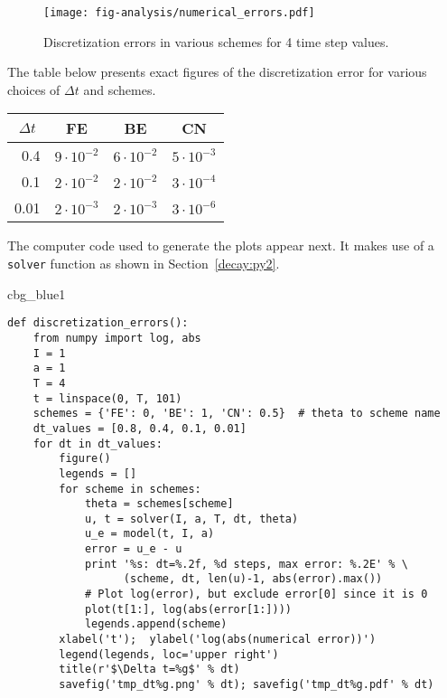 \documentclass[graybox,sectrefs,envcountresetchap,open=right,final]{svmonodo}
\newenvironment{_cod_tight}[1]{
   \def\FrameCommand{\colorbox{#1}}
   \FrameRule0.6pt\MakeFramed {\FrameRestore}\vskip3mm}
   {\vskip0mm\endMakeFramed}
\newenvironment{cod}[1]{
\bgroup\rmfamily
\fboxsep=0mm\relax
\begin{_cod_tight}{#1}
\list{}{\parsep=-2mm\parskip=0mm\topsep=0pt\leftmargin=2mm
\rightmargin=2\leftmargin\leftmargin=4pt\relax}
\item\relax}
{\endlist\end{_cod_tight}\egroup}
\begin{document}
\begin{figure}[!ht]  %
  \centerline{\texttt{[image: fig-analysis/numerical\_errors.pdf]}}
  \caption{
  Discretization errors in various schemes for 4 time step values. \label{decay:analysis:numerical_errors:fig}
  }
\end{figure}


The table below presents exact figures of the discretization error
for various choices of $\Delta t$ and schemes.



{\small   %

\vspace{4mm}

\begin{tabular}{rrrr}
\hline
\multicolumn{1}{c}{ $\Delta t$ } & \multicolumn{1}{c}{ FE } & \multicolumn{1}{c}{ BE } & \multicolumn{1}{c}{ CN } \\
\hline
0.4        & $9\cdot 10^{-2}$ & $6\cdot 10^{-2}$ & $ 5\cdot 10^{-3}$ \\
0.1        & $2\cdot 10^{-2}$ & $2\cdot 10^{-2}$ & $ 3\cdot 10^{-4}$ \\
0.01       & $2\cdot 10^{-3}$ & $2\cdot 10^{-3}$ & $ 3\cdot 10^{-6}$ \\
\hline
\end{tabular}

\vspace{4mm}

}


\noindent
The computer code used to generate the plots appear next. It makes use
of a \texttt{solver} function
as shown in Section~\ref{decay:py2}.

\begin{cod}{cbg_blue1}\begin{Verbatim}[numbers=none,fontsize=\fontsize{9pt}{9pt},baselinestretch=0.95,xleftmargin=2mm]
def discretization_errors():
    from numpy import log, abs
    I = 1
    a = 1
    T = 4
    t = linspace(0, T, 101)
    schemes = {'FE': 0, 'BE': 1, 'CN': 0.5}  # theta to scheme name
    dt_values = [0.8, 0.4, 0.1, 0.01]
    for dt in dt_values:
        figure()
        legends = []
        for scheme in schemes:
            theta = schemes[scheme]
            u, t = solver(I, a, T, dt, theta)
            u_e = model(t, I, a)
            error = u_e - u
            print '%s: dt=%.2f, %d steps, max error: %.2E' % \ 
                  (scheme, dt, len(u)-1, abs(error).max())
            # Plot log(error), but exclude error[0] since it is 0
            plot(t[1:], log(abs(error[1:])))
            legends.append(scheme)
        xlabel('t');  ylabel('log(abs(numerical error))')
        legend(legends, loc='upper right')
        title(r'$\Delta t=%g$' % dt)
        savefig('tmp_dt%g.png' % dt); savefig('tmp_dt%g.pdf' % dt)
\end{Verbatim}
\end{cod}
\noindent
\end{document}
